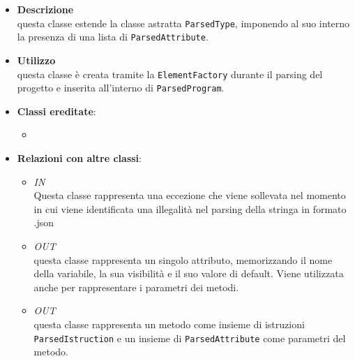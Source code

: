 \label{\nogloxy{swedesigner::server::project::ParsedClass}}
\begin{itemize}
\item \textbf{Descrizione}\\
questa classe estende la classe astratta \texttt{ParsedType}, imponendo al suo interno la presenza di una lista di \texttt{ParsedAttribute}. 
\item \textbf{Utilizzo}\\
questa classe è creata tramite la \texttt{ElementFactory} durante il parsing del progetto e inserita all'interno di \texttt{ParsedProgram}.
\item \textbf{Classi ereditate}:
\begin{itemize}
\item \hyperref[\nogloxy{swedesigner::server::project::ParsedType}]{}
\end{itemize}
\item \textbf{Relazioni con altre classi}:
\begin{itemize}
\item \textit{IN} \hyperref[\nogloxy{swedesigner::server::project::ParsedException}]{}\\
Questa classe rappresenta una eccezione che viene sollevata nel momento in cui viene identificata una illegalità nel parsing della stringa in formato .json
\item \textit{OUT} \hyperref[\nogloxy{swedesigner::server::project::ParsedAttribute}]{}\\
questa classe rappresenta un singolo attributo, memorizzando il nome della variabile, la sua visibilità e il suo valore di default. Viene utilizzata anche per rappresentare i parametri dei metodi.
\item \textit{OUT} \hyperref[\nogloxy{swedesigner::server::project::ParsedMethod}]{}\\
questa classe rappresenta un metodo come insieme di istruzioni \texttt{ParsedIstruction} e un insieme di \texttt{ParsedAttribute} come parametri del metodo.
\end{itemize}
\end{itemize}


